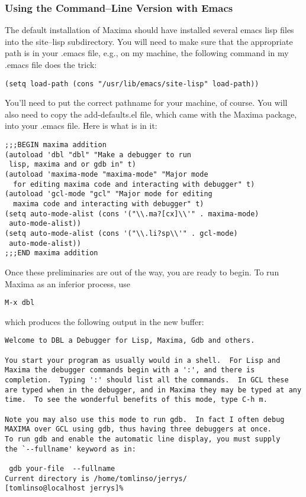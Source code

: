 \documentclass[titlepage]{article}
\begin{document}
\subsubsection{Using the Command--Line Version with Emacs}

The default installation of Maxima  should have installed several  emacs
lisp files into the site--lisp subdirectory.  You will need to make sure
that the appropriate path is in your .emacs file, e.g., on my machine,
the following command in my .emacs file does the trick:

\begin{verbatim}
(setq load-path (cons "/usr/lib/emacs/site-lisp" load-path))
\end{verbatim}

You'll need to put the correct pathname for your machine, of course.
You will also need to copy the add-defaults.el file, which came with the
Maxima package,  into your .emacs file.  Here is what is in it:

\begin{verbatim}
;;;BEGIN maxima addition
(autoload 'dbl "dbl" "Make a debugger to run
 lisp, maxima and or gdb in" t)
(autoload 'maxima-mode "maxima-mode" "Major mode
  for editing maxima code and interacting with debugger" t)
(autoload 'gcl-mode "gcl" "Major mode for editing
  maxima code and interacting with debugger" t)
(setq auto-mode-alist (cons '("\\.ma?[cx]\\'" . maxima-mode)
 auto-mode-alist))
(setq auto-mode-alist (cons '("\\.li?sp\\'" . gcl-mode)
 auto-mode-alist))
;;;END maxima addition
\end{verbatim}


Once these preliminaries are out of the way, you are ready to begin.  To
run Maxima as an inferior process, use

\begin{verbatim}
M-x dbl
\end{verbatim}
which produces the following output in the new buffer:
\begin{verbatim}
Welcome to DBL a Debugger for Lisp, Maxima, Gdb and others.

You start your program as usually would in a shell.  For Lisp and
Maxima the debugger commands begin with a ':', and there is
completion.  Typing ':' should list all the commands.  In GCL these
are typed when in the debugger, and in Maxima they may be typed at any
time.  To see the wonderful benefits of this mode, type C-h m.

Note you may also use this mode to run gdb.  In fact I often debug
MAXIMA over GCL using gdb, thus having three debuggers at once.
To run gdb and enable the automatic line display, you must supply
the `--fullname' keyword as in:

 gdb your-file  --fullname
Current directory is /home/tomlinso/jerrys/
[tomlinso@localhost jerrys]%
\end{verbatim}
\end{document}
